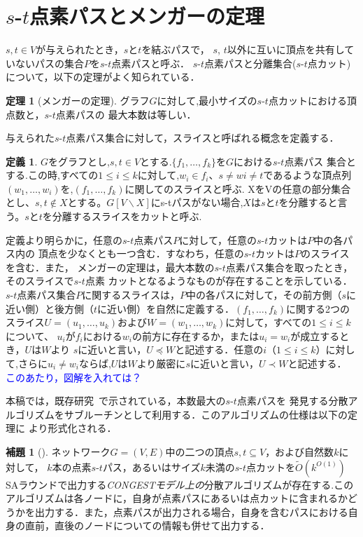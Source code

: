 \documentclass{thesis}
\theoremstyle{definition}
\newtheorem{theorem}{定理}
\newtheorem{lemma}{補題}
\newtheorem{definition}{定義}
\newcommand{\Izumi}[1]{\textcolor{blue}{#1}}
\begin{document}
\section{$s$-$t$点素パスとメンガーの定理}

$s, t \in V$が与えられたとき，$s$と$t$を結ぶパスで，
$s$, $t$以外に互いに頂点を共有していないパスの集合$P$を$s$-$t$点素パスと呼ぶ．
$s$-$t$点素パスと分離集合($s$-$t$点カット)について，以下の定理がよく知られている．

\begin{theorem}[メンガーの定理]
グラフ$G$に対して,最小サイズの$s$-$t$点カットにおける頂点数と，$s$-$t$点素パスの
最大本数は等しい．
\end{theorem}
与えられた$s$-$t$点素パス集合に対して，スライスと呼ばれる概念を定義する．
\begin{definition}
    $G$をグラフとし,$s,t\in V$とする.$\{f_1, \dots ,f_k\}$を$G$における$s$-$t$点素パス
    集合とする.この時,すべての$1\leq i\leq k$に対して,$w_i \in f_i$、$s \neq wi \neq t$であるような頂点列$(w_1, \dots ,w_i)$を,$(f_1, \dots ,f_k)$に関してのスライスと呼ぶ.
    XをVの任意の部分集合とし、$s,t \notin X$とする。$G[V\backslash X]$にs-tパスがない場合,$X$は$s$と$t$を分離すると言う。$s$と$t$を分離するスライスをカットと呼ぶ.
\end{definition}

定義より明らかに，任意の$s$-$t$点素パス$P$に対して，任意の$s$-$t$カットは$P$中の各パス内の
頂点を少なくとも一つ含む．すなわち，任意の$s$-$t$カットは$P$のスライスを含む．また，
メンガーの定理は，最大本数の$s$-$t$点素パス集合を取ったとき，そのスライスで$s$-$t$点素
カットとなるようなものが存在することを示している．
$s$-$t$点素パス集合$P$に関するスライスは，$P$中の各パスに対して，その前方側（$s$に近い側）と後方側（$t$に近い側）を自然に定義する．$(f_1, \dots ,f_k)$に関する2つのスライス$U=(u_1, \dots, u_k)$および$W=(w_1, \dots ,w_k)$に対して，すべての$1\leq i\leq k$について、
$u_i$が$f_i$における$w_i$の前方に存在するか，または$u_i=w_i$が成立するとき，$U$は$W$より
$s$に近いと言い，$U\preceq W$と記述する．任意の$i$（$1 \leq i \leq k$）に対して,さらに$u_i \neq w_i$ならば,$U$は$W$より厳密に$s$に近いと言い，$U \prec W$と記述する．
\Izumi{このあたり，図解を入れては？}


本稿では，既存研究~\cite{li2018distributed}で示されている，本数最大の$s$-$t$点素パスを
発見する分散アルゴリズムをサブルーチンとして利用する．このアルゴリズムの仕様は以下の定理に
より形式化される．

\begin{lemma}[\cite{li2018distributed}] \label{path}
ネットワーク$G=(V,E)$中の二つの頂点$s,t\subseteq V$，および自然数$k$に対して，
$k$本の点素$s$-$t$パス，あるいはサイズ$k$未満の$s$-$t$点カットを$\tilde{O}(k^{O(1)})$
SAラウンドで出力する\textit{CONGESTモデル上の}分散アルゴリズムが存在する.このアルゴリズムは各ノードに，自身が点素パスにあるいは点カットに含まれるかどうかを出力する．また，点素パスが出力される場合，自身を含むパスにおける自身の直前，直後のノードについての情報も併せて出力する．
\end{lemma}
\end{document}

